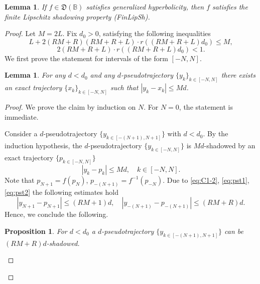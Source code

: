 \documentclass[12pt]{article}
\newcommand{\Bb}{\mathbb{B}}
\newcommand{\DUC}{\mathfrak{D}}
\newtheorem{lem}[thm]{Lemma}
\newtheorem{statement}[thm]{Proposition}
\theoremstyle{definition}
\begin{document}
\begin{lem}\label{lem:FinLipSh}
If $f\in\DUC(\Bb)$ satisfies generalized hyperbolicity, then $f$ satisfies the finite Lipschitz shadowing property (FinLipSh).
\end{lem}
\begin{proof}
Let $M = 2L$. Fix $d_0 > 0$, satisfying the following inequalities 
\begin{equation}\label{eq:M2'}
    L + 2(RM+R)(RM+R+L)\cdot r\left((RM+R+L)d_0\right) \leq M, 
\end{equation}
\begin{equation}\label{eq:M2''}
 2 (RM+R+L) \cdot r\left((RM+R+L)d_0\right) < 1.
\end{equation}
We first prove the statement for intervals of the form $[-N,N]$.
\begin{lem}\label{lem:NLipSh}
    For any $d < d_0$ and any $d$-pseudotrajectory $\{y_k\}_{k \in [-N, N]}$ there exists an exact trajectory $\{x_k\}_{k \in [-N, N]}$ such that
    $
    |y_k - x_k| \leq Md
    $.
\end{lem}
\begin{proof}
We prove the claim by induction on $N$. For $N=0$, the statement is immediate.

Consider a $d$-pseudotrajectory $\{y_{k \in [-(N+1), N+1]}\}$ with $d<d_0$. 
By the induction hypothesis, the $d$-pseudotrajectory $\{y_{k \in [-N, N]}\}$ is $Md$-shadowed by an exact trajectory $\{p_{k \in [-N, N]}\}$
\begin{equation}\label{Add4.1}
|y_k - p_k| \leq M d, \quad k \in [-N, N].
\end{equation}
Note that $p_{N+1} = f(p_N)$, $p_{-(N+1)} = f^{-1}(p_{-N})$. Due to \eqref{eq:C1-2}, \eqref{eq:pst1}, \eqref{eq:pst2} the following estimates hold
\begin{equation}\label{Add4.2}
|y_{N+1} - p_{N+1}| \leq (RM+1)d, \quad |y_{-(N+1)} - p_{-(N+1)}| \leq (RM+R)d.
\end{equation}
Hence, we conclude the following.
\begin{statement}\label{stat:dn+1}
For  $d< d_0$ a $d$-pseudotrajectory $\{y_{k \in [-(N+1), N+1]}\}$ can be $(RM+R)d$-shadowed.   
\end{statement}


\end{proof}
\end{proof}
\end{document}
